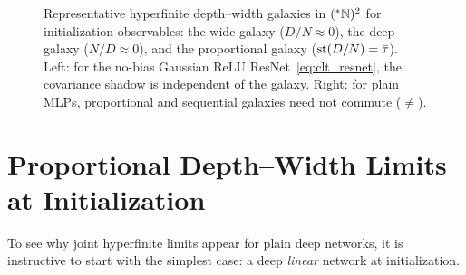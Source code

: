 \begin{figure}[htbp]
\caption{Representative hyperfinite depth--width galaxies in $({}^*\mathbb{N})^2$ for initialization observables: the wide galaxy ($D/N \approx 0$), the deep galaxy ($N/D \approx 0$), and the proportional galaxy ($\operatorname{st}(D/N) = \bar{\tau}$). Left: for the no-bias Gaussian ReLU ResNet~\eqref{eq:clt_resnet}, the covariance shadow is independent of the galaxy. Right: for plain MLPs, proportional and sequential galaxies need not commute ($\neq$).}\label{fig:depth_width_routes}
\end{figure}

\section{Proportional Depth--Width Limits at Initialization}\label{sec:prop_linear_init}

To see why joint hyperfinite limits appear for plain deep networks, it is instructive to start with the simplest case: a deep \emph{linear} network at initialization.

